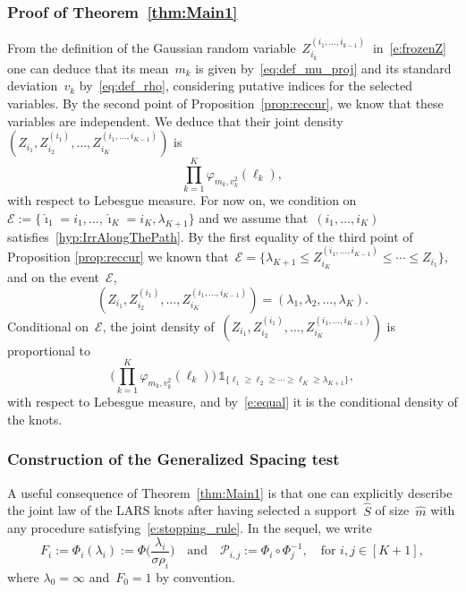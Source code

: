 \documentclass[final,numbib]{imaiai}%
\numberwithin{equation}{section}
\def\eq{\begin{equation}}
\def\qe{\end{equation}}
\def\cP{\mathcal{P}}
\renewcommand{\hat}{\widehat}
\newcommand{\<}{\langle}
\renewcommand{\>}{\rangle}
\newcommand{\1}{\mathds{1}}
\begin{document}
{\subsubsection{Proof of Theorem~\ref{thm:Main1}}
\label{proof:Main1}
From the definition of the Gaussian random variable~$ Z_{i_k}^{(i_1,\ldots, i_{k-1})}~$ in~\eqref{e:frozenZ} one can deduce that its mean~$m_k$ is given by~\eqref{eq:def_mu_proj} and its standard deviation~$v_k$ by~\eqref{eq:def_rho}, considering putative indices for the selected variables. By the second point of Proposition~\ref{prop:reccur}, we know that these variables are independent.
We deduce that their joint density~$(Z_{i_1}, Z_{i_{2}}^{(i_1)}, \ldots, Z_{i_{K}}^{(i_1,\ldots, i_{K-1})})$ is 
\[
\prod_{k=1}^K \varphi_{m_k,v_k^2}(\ell_k),
\]
 with respect to Lebesgue measure.
For now on, we condition on  $\mathcal E:=\{\hat \imath_1 =i_1, \ldots,\hat \imath_{K}=i_{K},\lambda_{K+1}\}$ and we assume that~$(i_1,\ldots, i_K)$ satisfies~\eqref{hyp:IrrAlongThePath}. By the first equality of the third point of Proposition \ref{prop:reccur} we known that~$\mathcal E=\big\{\lambda_{K+1}\leq Z_{i_{K}}^{(i_1,\ldots, i_{K-1})} \leq  \cdots \leq Z_{i_1}\big\}$, and on the event~$\mathcal E$,
\eq
\label{e:equal}
(Z_{i_1}, Z_{i_{2}}^{(i_1)}, \ldots, Z_{i_{K}}^{(i_1,\ldots, i_{K-1})})
=
(\lambda_1,\lambda_2,\ldots,\lambda_K).
\qe
Conditional on~$\mathcal E$, the joint density of~$(Z_{i_1}, Z_{i_{2}}^{(i_1)}, \ldots, Z_{i_{K}}^{(i_1,\ldots, i_{K-1})})$ is proportional to
\eq
 \label{zaz0}
\Big(
\prod_{k=1}^K \varphi_{m_k,v_k^2}(\ell_k)
\Big)
\,
\mathds{1}_{\{\ell_1\geq \ell_{2}\geq\cdots\geq\ell_{K}\geq\lambda_{K+1}\}},
\qe
 with respect to Lebesgue measure, and by~\eqref{e:equal} it is the conditional density of the knots.

\subsubsection{Construction of the Generalized Spacing test}
\label{sec:fabc}
A useful consequence of Theorem~\ref{thm:Main1} is that one can explicitly describe the joint law of the LARS knots after having selected a support~$\hat S$ of size~$\hat m$ with any procedure satisfying~{\eqref{e:stopping_rule}}.
In the sequel, we write
\eq
\label{eq:pij}
F_i:=\Phi_{i}({\lambda_i}) :=\Phi\Big(\frac{\lambda_i}{\sigma{\rho_i}}\Big)
\quad\text{and}\quad \cP_{i,j}:=\Phi_{i}\circ\Phi_{j}^{-1},\quad \text{for }i,j\in[K+1],
\qe
 where
 $\lambda_0=\infty$ and~$F_0=1$ by convention.
 
}
\end{document}
